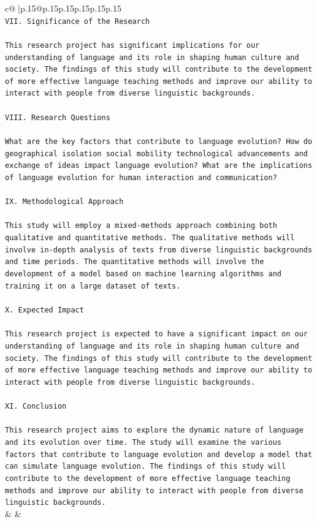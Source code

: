 \documentclass{article}
\begin{document}
{\begin{supertabular}{c@{$\;$}|p{.15\linewidth}@{}p{.15\linewidth}p{.15\linewidth}p{.15\linewidth}p{.15\linewidth}p{.15\linewidth}}
{{{\\ 
\texttt{VII. Significance of the Research} \\
\\ 
\texttt{This research project has significant implications for our understanding of language and its role in shaping human culture and society. The findings of this study will contribute to the development of more effective language teaching methods and improve our ability to interact with people from diverse linguistic backgrounds.} \\
\\ 
\texttt{VIII. Research Questions} \\
\\ 
\texttt{What are the key factors that contribute to language evolution? How do geographical isolation social mobility technological advancements and exchange of ideas impact language evolution? What are the implications of language evolution for human interaction and communication?} \\
\\ 
\texttt{IX. Methodological Approach} \\
\\ 
\texttt{This study will employ a mixed{-}methods approach combining both qualitative and quantitative methods. The qualitative methods will involve in{-}depth analysis of texts from diverse linguistic backgrounds and time periods. The quantitative methods will involve the development of a model based on machine learning algorithms and training it on a large dataset of texts.} \\
\\ 
\texttt{X. Expected Impact} \\
\\ 
\texttt{This research project is expected to have a significant impact on our understanding of language and its role in shaping human culture and society. The findings of this study will contribute to the development of more effective language teaching methods and improve our ability to interact with people from diverse linguistic backgrounds.} \\
\\ 
\texttt{XI. Conclusion} \\
\\ 
\texttt{This research project aims to explore the dynamic nature of language and its evolution over time. The study will examine the various factors that contribute to language evolution and develop a model that can simulate language evolution. The findings of this study will contribute to the development of more effective language teaching methods and improve our ability to interact with people from diverse linguistic backgrounds.} \\
            }
        }
    }
    & & \\ \\


\end{supertabular}}
\end{document}
